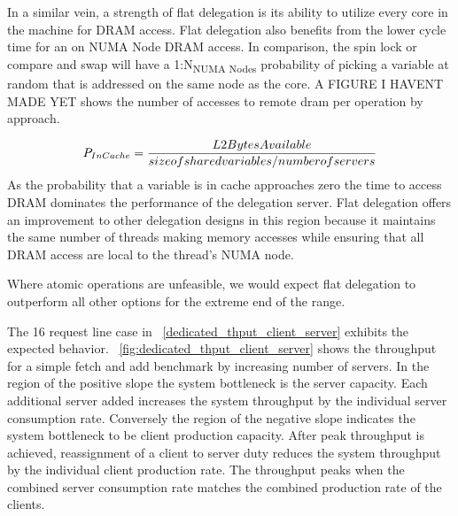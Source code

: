 \documentclass{uicthesi}
\begin{document}

In a similar vein, a strength of flat delegation is its ability to utilize every core in the machine for DRAM access. Flat delegation also benefits from the lower cycle time for an on NUMA Node DRAM access. In comparison, the spin lock or compare and swap will have a 1:N\textsubscript{NUMA Nodes} probability of picking a variable at random that is addressed on the same node as the core. A FIGURE I HAVENT MADE YET shows the number of accesses to remote dram per operation by approach. 

\begin{displaymath}
{P_{In Cache}} = {{L2BytesAvailable} \over { size of shared variables / number of servers}}
\end{displaymath}
As the probability that a variable is in cache approaches zero the time to access DRAM dominates the performance of the delegation server. Flat delegation offers an improvement to other delegation designs in this region because it maintains the same number of threads making memory accesses while ensuring that all DRAM access are local to the thread's NUMA node. 

Where atomic operations are unfeasible, we would expect flat delegation to outperform all other options for the extreme end of the range. 





The 16 request line case in ~\ref{dedicated_thput_client_server} exhibits the expected behavior. ~\ref{fig:dedicated_thput_client_server} shows the throughput for a simple fetch and add benchmark by increasing number of servers. In the region of the positive slope the system bottleneck is the server capacity. Each additional server added increases the system throughput by the individual server consumption rate. Conversely the region of the negative slope indicates the system bottleneck to be client production capacity. After peak throughput is achieved, reassignment of a client to server duty reduces the system throughput by the individual client production rate. The throughput peaks when the combined server consumption rate matches the combined production rate of the clients. 
\end{document}
